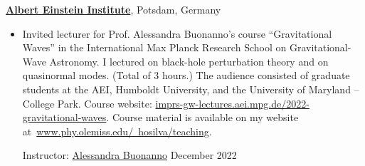 \documentclass[10pt]{article}
\begin{document}
\href{http://www.aei.mpg.de}{\textbf{Albert Einstein Institute}}, Potsdam, Germany

\begin{itemize}
    \item Invited lecturer for Prof. Alessandra Buonanno's course ``Gravitational Waves'' in the
    International Max Planck Research School on Gravitational-Wave Astronomy.
    I lectured on black-hole perturbation theory and on quasinormal modes. (Total of 3 hours.) The audience consisted of graduate students at the AEI, Humboldt University, and the University of Maryland -- College Park.
    Course website: \href{https://imprs-gw-lectures.aei.mpg.de/2022-gravitational-waves/}{imprs-gw-lectures.aei.mpg.de/2022-gravitational-waves}.
    Course material is available on my website at~\href{https://www.phy.olemiss.edu/~hosilva/teaching}{www.phy.olemiss.edu/~hosilva/teaching}.

    Instructor: \href{https://www.aei.mpg.de/alessandra-buonanno}{Alessandra Buonanno} \hfill{December 2022}
\end{itemize}
\end{document}
